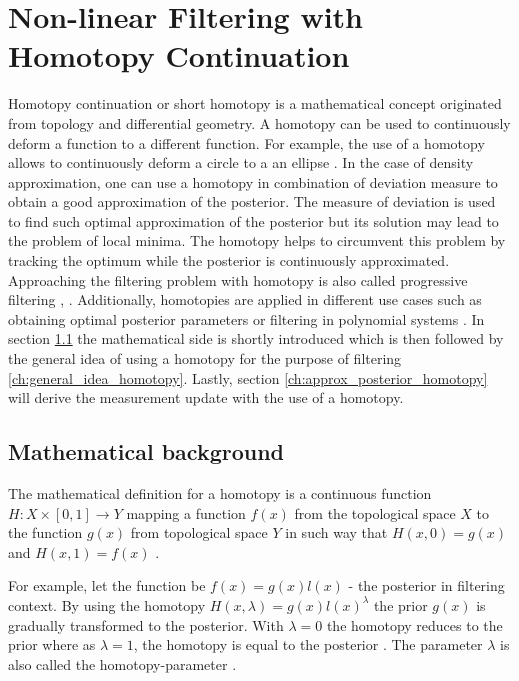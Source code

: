 \documentclass[a4paper]{IEEEtran}
\begin{document}
\section{Non-linear Filtering with Homotopy Continuation}
\label{ch:homotopy_continuation}

Homotopy continuation or short homotopy is a mathematical concept originated from topology and differential geometry. A homotopy can be used to continuously deform a function to a different function. For example, the use of a homotopy allows to continuously deform a
circle to a an ellipse \cite{liao2012}. In the case of density approximation, one can use a homotopy in combination of deviation measure to obtain a good approximation of the posterior. The measure of deviation is used to find such optimal approximation of the posterior but its solution may lead to the problem of local minima.
The homotopy helps to circumvent this problem by tracking the optimum while the posterior is continuously approximated.
Approaching the filtering problem with homotopy is also called progressive filtering \cite{hanebeck2003}, \cite{hanebeck2012a}. Additionally, homotopies are applied in different use cases such as obtaining optimal posterior parameters \cite{hagmar2011} or filtering in polynomial systems \cite{huber}.
In section \ref{ch:math_background_homotopy} the mathematical side is shortly introduced which is then followed by the general idea of using a homotopy for the purpose of filtering \ref{ch:general_idea_homotopy}. 
Lastly, section \ref{ch:approx_posterior_homotopy} will derive the measurement update with the use of a homotopy.

\subsection{Mathematical background}
\label{ch:math_background_homotopy}
The mathematical definition for a homotopy is a continuous function $H:X \times [0,1] \rightarrow Y$ mapping a function $f(x)$ from the topological space $X$ to the function $g(x)$ from topological space $Y$ in such way 
that $H(x,0)=g(x)$ and $H(x,1)=f(x)$ \cite{liao2012}. 

For example, let the function be $f(x)=g(x)l(x)$ - the posterior in filtering context. By using the homotopy $H(x, \lambda) = g(x)l(x)^{\lambda}$ the prior
$g(x)$ is gradually transformed to the posterior. With $\lambda = 0$ the homotopy reduces to the prior where as $\lambda = 1$, the homotopy is equal to the posterior \cite{daum2007}. The parameter $\lambda$ is also called the homotopy-parameter \cite{liao2012}.
\end{document}
